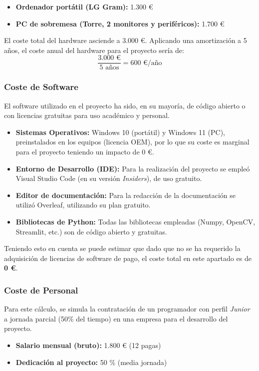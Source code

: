 \begin{itemize}
    \item \textbf{Ordenador portátil (LG Gram):} 1.300 €
    \item \textbf{PC de sobremesa (Torre, 2 monitores y periféricos):} 1.700 €
\end{itemize}

El coste total del hardware asciende a 3.000 €. Aplicando una amortización a 5 años, el coste anual del hardware para el proyecto sería de:
$$ \frac{3.000\text{ €}}{5\text{ años}} = 600\text{ €/año} $$

\subsubsection{Coste de Software}
El software utilizado en el proyecto ha sido, en su mayoría, de código abierto o con licencias gratuitas para uso académico y personal.

\begin{itemize}
    \item \textbf{Sistemas Operativos:} Windows 10 (portátil) y Windows 11 (PC), preinstalados en los equipos (licencia OEM), por lo que su coste es marginal para el proyecto teniendo un impacto de 0 €.
    \item \textbf{Entorno de Desarrollo (IDE):} Para la realización del proyecto se empleó Visual Studio Code (en su versión \textit{Insiders}), de uso gratuito.
    \item \textbf{Editor de documentación:} Para la redacción de la documentación se utilizó Overleaf, utilizando su plan gratuito.
    \item \textbf{Bibliotecas de Python:} Todas las bibliotecas empleadas (Numpy, OpenCV, Streamlit, etc.) son de código abierto y gratuitas.
\end{itemize}

Teniendo esto en cuenta se puede estimar que dado que no se ha requerido la adquisición de licencias de software de pago, el coste total en este apartado es de \textbf{0 €}.

\subsubsection{Coste de Personal}
Para este cálculo, se simula la contratación de un programador con perfil \textit{Junior} a jornada parcial (50\% del tiempo) en una empresa para el desarrollo del proyecto.

\begin{itemize}
    \item \textbf{Salario mensual (bruto):} 1.800 € (12 pagas)
    \item \textbf{Dedicación al proyecto:} 50 \% (media jornada)
\end{itemize}

